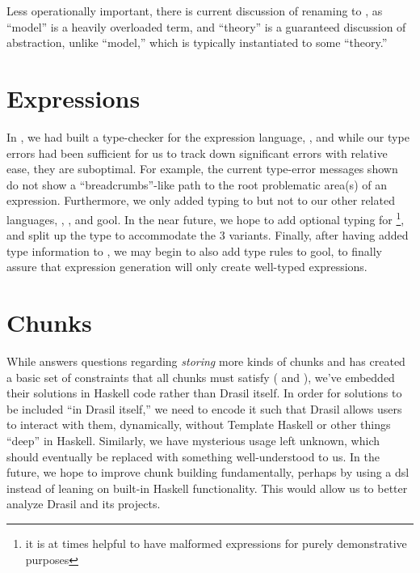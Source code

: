 Less operationally important, there is current discussion of renaming
\ModelKinds{} to \TheoryKinds{} \cite{DrasilIssue2599RenamingModels}, as
``model'' is a heavily overloaded term, and ``theory'' is a guaranteed
discussion of abstraction, unlike ``model,'' which is typically instantiated to
some ``theory.''

\section{Expressions}
\label{chap:futureWork:sec:expressions}

In , we had built a type-checker for the expression
language, \Expr{}, and while our type errors had been sufficient for us to track
down significant errors with relative ease, they are suboptimal. For example,
the current type-error messages shown do not show a ``breadcrumbs''-like path to
the root problematic area(s) of an expression. Furthermore, we only added typing
to \Expr{} but not to our other related languages, \CodeExpr{}, \ModelExpr{},
and \acs{gool}. In the near future, we hope to add optional typing for
\ModelExpr{}\footnote{it is at times helpful to have malformed expressions for
purely demonstrative purposes}, and split up the \Space{} type to accommodate
the 3 variants. Finally, after having added type information to \CodeExpr{}, we
may begin to also add type rules to \acs{gool}, to finally assure that
expression generation will only create well-typed expressions.

\section{Chunks}
\label{chap:futureWork:sec:chunks}

While  answers questions regarding \textit{storing}
more kinds of chunks and has created a basic set of constraints that all chunks
must satisfy (\HasUID{} and \HasChunkRefs{}), we've embedded their solutions in
Haskell code rather than Drasil itself. In order for solutions to be included
``in Drasil itself,'' we need to encode it such that Drasil allows users to
interact with them, dynamically, without Template
Haskell\cite{GHC2020TemplateHaskell} or other things ``deep'' in Haskell.
Similarly, we have mysterious \Typeable{} usage left unknown, which should
eventually be replaced with something well-understood to us. In the future, we
hope to improve chunk building fundamentally, perhaps by using a \acs{dsl}
instead of leaning on built-in Haskell functionality. This would allow us to
better analyze Drasil and its projects.

